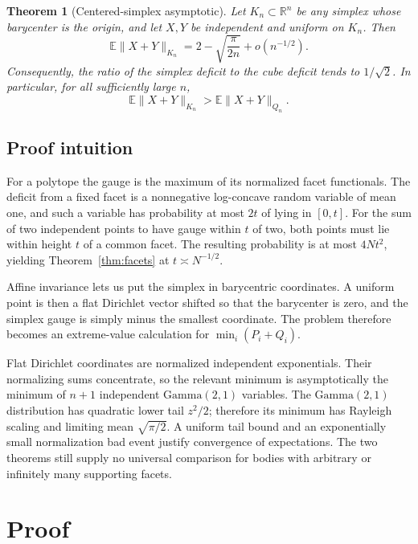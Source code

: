 \documentclass[11pt]{article}
\newtheorem{theorem}{Theorem}
\newcommand{\E}{\mathbb E}
\newcommand{\R}{\mathbb R}
\begin{document}
\begin{theorem}[Centered-simplex asymptotic]\label{thm:main}
Let $K_n\subset\R^n$ be any simplex whose barycenter is the origin, and let
$X,Y$ be independent and uniform on $K_n$.  Then
\begin{equation}\label{eq:main}
 \E\|X+Y\|_{K_n}
 =2-\sqrt{\frac{\pi}{2n}}+o(n^{-1/2}).
\end{equation}
Consequently, the ratio of the simplex deficit to the cube deficit tends to
$1/\sqrt2$.  In particular, for all sufficiently large $n$,
\[
 \E\|X+Y\|_{K_n}>\E\|X+Y\|_{Q_n}.
\]
\end{theorem}

\subsection*{Proof intuition}

For a polytope the gauge is the maximum of its normalized facet
functionals.  The deficit from a fixed facet is a nonnegative log-concave
random variable of mean one, and such a variable has probability at most
$2t$ of lying in $[0,t]$.  For the sum of two independent points to have
gauge within $t$ of two, both points must lie within height $t$ of a common
facet.  The resulting probability is at most $4Nt^2$, yielding
Theorem~\ref{thm:facets} at $t\asymp N^{-1/2}$.

Affine invariance lets us put the simplex in barycentric coordinates.  A
uniform point is then a flat Dirichlet vector shifted so that the barycenter
is zero, and the simplex gauge is simply minus the smallest coordinate.
The problem therefore becomes an extreme-value calculation for
$\min_i(P_i+Q_i)$.

Flat Dirichlet coordinates are normalized independent exponentials.  Their
normalizing sums concentrate, so the relevant minimum is asymptotically the
minimum of $n+1$ independent $\mathrm{Gamma}(2,1)$ variables.  The
$\mathrm{Gamma}(2,1)$ distribution has quadratic lower tail $z^2/2$;
therefore its minimum has Rayleigh scaling and limiting mean
$\sqrt{\pi/2}$.  A uniform tail bound and an exponentially small
normalization bad event justify convergence of expectations.  The two
theorems still supply no universal comparison for bodies with arbitrary or
infinitely many supporting facets.

\section{Proof}
\end{document}

